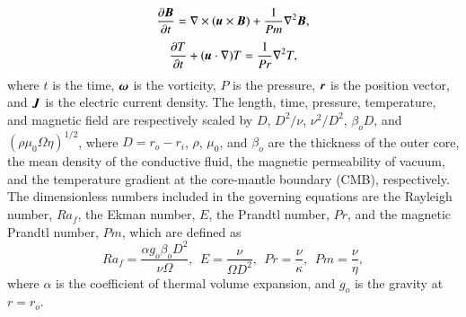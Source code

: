 %
\begin{equation}
\frac{\partial \mbox{\boldmath$B$}}{\partial t} =
 \nabla \times (\mbox{\boldmath$u$} \times \mbox{\boldmath$B$} )
 + \frac{1}{Pm} \nabla^2 \mbox{\boldmath$B$} ,
\label{eq:induction}
\end{equation}
%
\begin{equation}
\frac{\partial T}{\partial t} 
 + ( \mbox{\boldmath$u$} \cdot \nabla ) T =
 \frac{1}{Pr} \nabla^2 T ,
\label{eq:heat}
\end{equation}
%
where $t$ is the time, $\mbox{\boldmath$\omega$}$ is the vorticity, $P$ is the pressure, $\mbox{\boldmath$r$}$ is the position vector, and $\mbox{\boldmath$J$}$ is the electric current density.
The length, time, pressure, temperature, and magnetic field are respectively scaled by $D$, $D^2/\nu$, $\nu^2 /D^2$, $\beta_o D$, and $(\rho \mu_0 \Omega \eta )^{1/2}$,
where $D = r_o - r_i$, $\rho$, $\mu_0$, and $\beta_o$ are the thickness of the outer core, the mean density of the conductive fluid, the magnetic permeability of vacuum, and the temperature gradient at the core-mantle boundary (CMB), respectively.
The dimensionless numbers included in the governing equations are the Rayleigh number, $Ra_f$, the Ekman number, $E$, the Prandtl number, $Pr$, and the magnetic Prandtl number, $Pm$, which are defined as
%
\begin{equation}
Ra_f = \frac{\alpha g_o \beta_o D^2}{\nu \Omega},~~
E = \frac{\nu}{\Omega D^2},~~
Pr = \frac{\nu}{\kappa},~~
Pm = \frac{\nu}{\eta},
\label{eq:dimensionless_numbers}
\end{equation}
%
where $\alpha$ is the coefficient of thermal volume expansion, and $g_o$ is the gravity at $r = r_o$.

